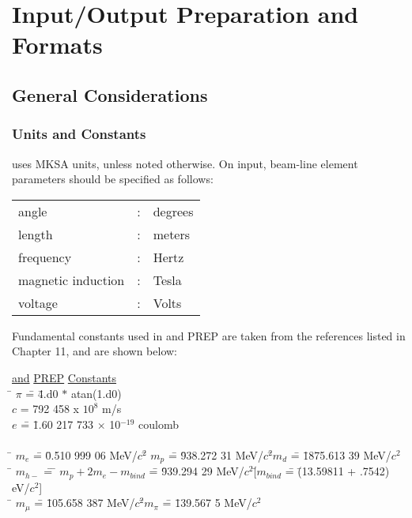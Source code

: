 
\chapter{Input/Output Preparation and Formats}

\section{General Considerations}

\subsection{Units and Constants}
     \Mary uses MKSA units, unless noted otherwise.   On input, beam-line
element parameters should be specified as follows:
\begin{center}
\begin{tabular}{lcl}
     angle               & : & degrees  \\
     length              & : & meters \\
     frequency           & : & Hertz   \\
     magnetic induction  & : & Tesla   \\
     voltage             & : & Volts
\end{tabular}
\end{center}
 Fundamental constants used in \Mary and PREP are taken from the references listed in Chapter 11, and are shown below:
\begin{tabbing}
\underline{\Mary} \underline{and} \underline{PREP} \underline{Constants} \\
\hspace{.375in}\= $\pi$ \= = \= 4.d0 $\ast$ atan(1.d0)    \\
     \> $c$ \> =  792 458 x $10^8$  m/s     \\
 \> $e$ \= = \= 1.60 217 733 $\times$ 10$^{-19}$ coulomb     \\
\\
\hspace{.3in}\= $m_e$ \= = \= 0.510 999 06 MeV/$c^2$\hspace{.2in}\=
$m_p$ \= = \= 938.272 31 MeV/$c^2$\hspace{.2in}\=$m_d$ \= = \=
1875.613 39 MeV/$c^2$ \\
\hspace{.3in}\= $m_{h-}$ \= = \=  $m_p + 2m_e - m_{bind}$ \= = \= 939.294
29 MeV/$c^2$\hspace{.2in}\= [$m_{bind}$ \= = \= (13.59811 + .7542)
eV/$c^2$] \\
\hspace{.3in}\= $m_{\mu}$ \= = \= 105.658 387
MeV/$c^2$\hspace{.2in}\=$m_{\pi}$  \= = \= 139.567 5 MeV/$c^2$
\end{tabbing}

